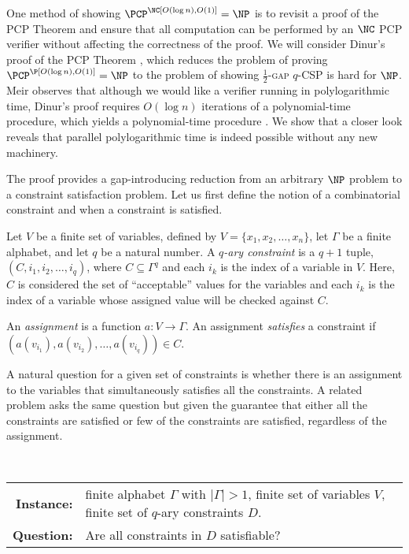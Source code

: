 One method of showing $\PCP^\NC[O(\log n), O(1)] = \NP$ is to revisit a proof of the PCP Theorem and ensure that all computation can be performed by an $\NC$ PCP verifier without affecting the correctness of the proof.
We will consider Dinur's proof of the PCP Theorem \autocite{dinur07}, which reduces the problem of proving $\PCP^\P[O(\log n), O(1)] = \NP$ to the problem of showing \textsc{$\frac{1}{2}$-gap $q$-CSP} is hard for $\NP$.
Meir observes that although we would like a verifier running in polylogarithmic time, Dinur's proof requires $O(\log n)$ iterations of a polynomial-time procedure, which yields a polynomial-time procedure \autocite[Section~1.2.1]{meir09}.
We show that a closer look reveals that parallel polylogarithmic time is indeed possible without any new machinery.

The proof provides a gap-introducing reduction from an arbitrary $\NP$ problem to a constraint satisfaction problem.
Let us first define the notion of a combinatorial constraint and when a constraint is satisfied.

\begin{definition}
  Let $V$ be a finite set of variables, defined by $V = \{x_1, x_2, \dotsc, x_n\}$, let $\Gamma$ be a finite alphabet, and let $q$ be a natural number.
  A \emph{$q$-ary constraint} is a $q + 1$ tuple, $(C, i_1, i_2, \dotsc, i_q)$, where $C \subseteq \Gamma^q$ and each $i_k$ is the index of a variable in $V$.
  Here, $C$ is considered the set of ``acceptable'' values for the variables and each $i_k$ is the index of a variable whose assigned value will be checked against $C$.

  An \emph{assignment} is a function $a \colon V \to \Gamma$.
  An assignment \emph{satisfies} a constraint if $(a(v_{i_1}), a(v_{i_2}), \dotsc, a(v_{i_q})) \in C$.
\end{definition}

A natural question for a given set of constraints is whether there is an assignment to the variables that simultaneously satisfies all the constraints.
A related problem asks the same question but given the guarantee that either all the constraints are satisfied or few of the constraints are satisfied, regardless of the assignment.

\begin{definition}
  \mbox{} \\
  \begin{tabular}{r p{9.5cm}}
    \textbf{Instance:} & finite alphabet $\Gamma$ with $|\Gamma| > 1$, finite set of variables $V$, finite set of $q$-ary constraints $D$. \\
    \textbf{Question:} & Are all constraints in $D$ satisfiable?
  \end{tabular}
\end{definition}

